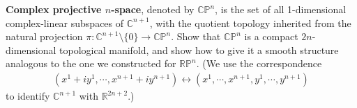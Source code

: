 \clearpage
{}
\textbf{Complex projective $n$-space}, denoted by $\mathbb{CP}^n$, is the set of all 1-dimensional complex-linear subspaces of $\mathbb{C}^{n+1}$, with the quotient topology inherited
from the natural projection $\pi:\mathbb{C}^{n+1}\setminus \{0\}\to \mathbb{CP}^n$. Show that $\mathbb{CP}^n$ is a
compact $2n$-dimensional topological manifold, and show how to give it a smooth structure analogous to the one we constructed for $\mathbb{RP}^n$. (We use the correspondence
\begin{align}
    (x^1+iy^1,\cdots,x^{n+1}+iy^{n+1}) \longleftrightarrow (x^1,\cdots,x^{n+1},y^1,\cdots,y^{n+1})
\end{align}
to identify $\mathbb{C}^{n+1}$ with $\mathbb{R}^{2n+2}$.)

\answer{}
